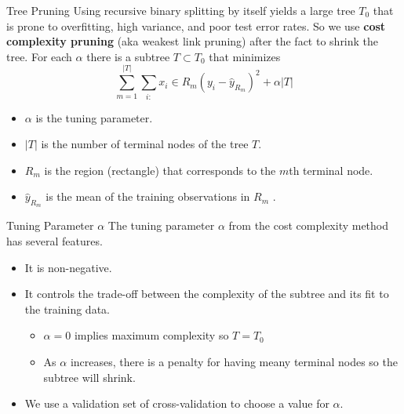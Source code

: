 \documentclass[
  ignorenonframetext,
  aspectratio=169,
]{beamer}
\begin{document}
\begin{frame}{Tree Pruning}
\protect\hypertarget{tree-pruning}{}
Using recursive binary splitting by itself yields a large tree \(T_0\)
that is prone to overfitting, high variance, and poor test error rates.
So we use \textbf{cost complexity pruning} (aka weakest link pruning)
after the fact to shrink the tree. For each \(\alpha\) there is a
subtree \(T \subset T_0\) that minimizes
\[\sum_{m=1}^{|T|} \sum_{i:} x_{i} \in R_{m}\left(y_{i}-\hat{y}_{R_{m}}\right)^{2}+\alpha|T|\]

\begin{itemize}
\item
  \(\alpha\) is the tuning parameter.
\item
  \(|T|\) is the number of terminal nodes of the tree \(T\).
\item
  \(R_m\) is the region (rectangle) that corresponds to the \(m\)th
  terminal node.
\item
  \(\hat{y}_{R_m}\) is the mean of the training observations in \(R_m\)
  .
\end{itemize}
\end{frame}

\begin{frame}{Tuning Parameter \(\alpha\)}
\protect\hypertarget{tuning-parameter-alpha}{}
The tuning parameter \(\alpha\) from the cost complexity method has
several features.

\begin{itemize}
\item
  It is non-negative.
\item
  It controls the trade-off between the complexity of the subtree and
  its fit to the training data.

  \begin{itemize}
  \item
    \(\alpha = 0\) implies maximum complexity so \(T = T_0\)
  \item
    As \(\alpha\) increases, there is a penalty for having meany
    terminal nodes so the subtree will shrink.
  \end{itemize}
\item
  We use a validation set of cross-validation to choose a value for
  \(\alpha\).
\end{itemize}
\end{frame}
\end{document}
